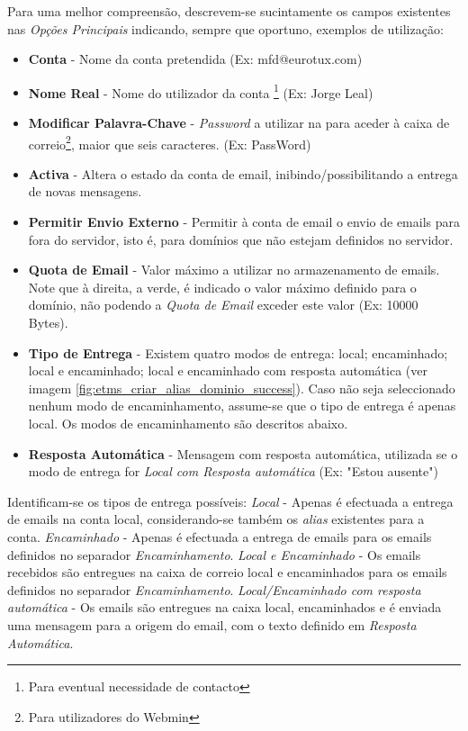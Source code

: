 Para uma melhor compreensão, descrevem-se sucintamente os campos existentes nas \textit{Opções Principais} indicando, sempre que oportuno, exemplos de utilização:
\begin{itemize}
\item \textbf{Conta} - Nome da conta pretendida (Ex: mfd@eurotux.com)
\item \textbf{Nome Real} - Nome do utilizador da conta \footnote{Para eventual necessidade de contacto} (Ex: Jorge Leal)
\item \textbf{Modificar Palavra-Chave} - \textit{Password} a utilizar na para aceder à caixa de correio\footnote{Para utilizadores do Webmin}, maior que seis caracteres. (Ex: PassWord)
\item \textbf{Activa} - Altera o estado da conta de email, inibindo/possibilitando a entrega de novas mensagens.
\item \textbf{Permitir Envio Externo} - Permitir à conta de email o envio de emails para fora do servidor, isto é, para domínios que não estejam definidos no servidor.
\item \textbf{Quota de Email} - Valor máximo a utilizar no armazenamento de emails. Note que à direita, a verde, é indicado o valor máximo definido para o domínio, não podendo a \textit{Quota de Email} exceder este valor (Ex: 10000 Bytes).
\item \textbf{Tipo de Entrega} - Existem quatro modos de entrega: local; encaminhado; local e encaminhado; local e encaminhado com resposta automática (ver imagem \ref{fig:etms_criar_alias_dominio_success}). Caso não seja seleccionado nenhum modo de encaminhamento, assume-se que o tipo de entrega é apenas local. Os modos de encaminhamento são descritos abaixo.
\item \textbf{Resposta Automática} - Mensagem com resposta automática, utilizada se o modo de entrega for \textit{Local com Resposta automática} (Ex: "Estou ausente")
\end{itemize}

Identificam-se os tipos de entrega possíveis:
\textit{Local} - Apenas é efectuada a entrega de emails na conta local, considerando-se também os \textit{alias} existentes para a conta.
\textit{Encaminhado} - Apenas é efectuada a entrega de emails para os emails definidos no separador \textit{Encaminhamento}.
\textit{Local e Encaminhado} - Os emails recebidos são entregues na caixa de correio local e encaminhados para os emails definidos no separador \textit{Encaminhamento}.
\textit{Local/Encaminhado com resposta automática} - Os emails são entregues na caixa local, encaminhados e é enviada uma mensagem para a origem do email, com o texto definido em \textit{Resposta Automática}.

